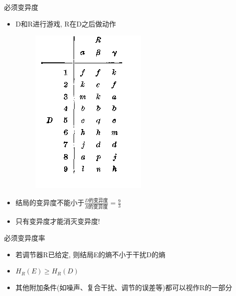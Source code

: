 \documentclass[12pt,AutoFakeBold,aspectratio=43,mathserif]{beamer}
\begin{document}
    \begin{frame}{必须变异度}
        \begin{itemize}
              \item D和R进行游戏, R在D之后做动作
              \begin{figure}[H]
                \centering
                \includegraphics[width=.4\textwidth]{figures/pic2.png}
                \end{figure}
                \item 结局的变异度不能小于$\frac{D\text{的变异度}}{R\text{的变异度}}=\frac{9}{3}$
                \item 只有变异度才能消灭变异度!
        \end{itemize}
    \end{frame}
    \begin{frame}{必须变异度率}
        \begin{itemize}
                \item 若调节器R已给定, 则结局E的熵不小于干扰D的熵
                \item $H_R(E)\geq H_R(D)$
                \item 其他附加条件(如噪声、复合干扰、调节的误差等)都可以视作R的一部分
        \end{itemize}
    \end{frame}
\end{document}
